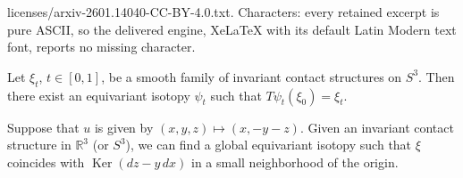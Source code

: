 \documentclass[10pt,a4paper]{amsart}
\DeclareMathOperator{\Ker}{Ker}
\newcommand{\R}{\mathbb{R}}
\begin{document}
licenses/arxiv-2601.14040-CC-BY-4.0.txt. Characters: every retained excerpt is pure ASCII, so the delivered engine, XeLaTeX with its default Latin Modern text font, reports no missing character.
\begin{prop}\label{EGray}
	Let $\xi_t$, $t \in [0,1]$, be a smooth family of invariant contact structures on $S^3$. Then there exist an equivariant isotopy $\psi_t$ such that $T\psi_t(\xi_0) = \xi_t$. 
\end{prop}

\begin{prop}\label{EDarbouxustd}
	Suppose that $u$ is given by $(x,y,z) \mapsto (x,-y-z)$. Given an invariant contact structure in $\R^3$ (or $S^3$), we can find a global equivariant isotopy such that $\xi$ coincides with $\Ker(dz - y\,dx)$ in a small neighborhood of the origin.
\end{prop}
\end{document}
